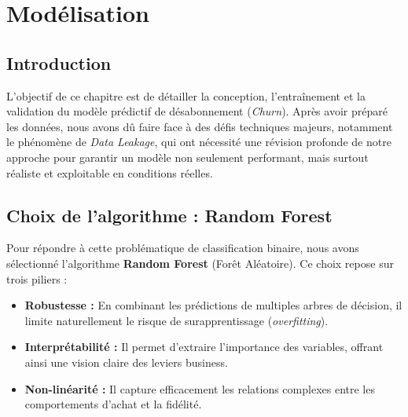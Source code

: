 \section{Modélisation}

\subsection{Introduction}
L'objectif de ce chapitre est de détailler la conception, l'entraînement et la validation du modèle prédictif de désabonnement (\textit{Churn}). Après avoir préparé les données, nous avons dû faire face à des défis techniques majeurs, notamment le phénomène de \textit{Data Leakage}, qui ont nécessité une révision profonde de notre approche pour garantir un modèle non seulement performant, mais surtout réaliste et exploitable en conditions réelles.

\subsection{Choix de l'algorithme : Random Forest}
Pour répondre à cette problématique de classification binaire, nous avons sélectionné l'algorithme \textbf{Random Forest} (Forêt Aléatoire). Ce choix repose sur trois piliers :
\begin{itemize}
	\item \textbf{Robustesse :} En combinant les prédictions de multiples arbres de décision, il limite naturellement le risque de surapprentissage (\textit{overfitting}).
	\item \textbf{Interprétabilité :} Il permet d'extraire l'importance des variables, offrant ainsi une vision claire des leviers business.
	\item \textbf{Non-linéarité :} Il capture efficacement les relations complexes entre les comportements d'achat et la fidélité.
\end{itemize}

